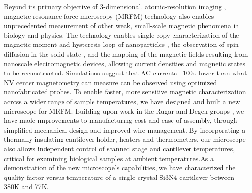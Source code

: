 Beyond its primary objective of 3-dimensional, atomic-resolution imaging \cite{Nichol_2013}, magnetic resonance force microscopy (MRFM) technology also enables unprecedented measurement of other weak, small-scale magnetic phenomena in biology and physics. The technology enables single-copy characterization of the magnetic moment and hysteresis loop of nanoparticles \cite{Weber_2012}, the observation of spin diffusion in the solid state \cite{Cardellino_2014}, and the mapping of the magnetic fields resulting from nanoscale electromagnetic devices, allowing current densities \cite{Chang_2017} \cite{Yongsunthon_2001} and magnetic states \cite{Tao_2016} to be reconstructed.  Simulations suggest that AC currents ~100x lower than what NV center magnetometry can measure \cite{Chang_2017} can be observed using optimized nanofabricated probes.
To enable faster, more sensitive magnetic characterization across a wider range of sample temperatures, we have designed and built a new microscope for MRFM. Building upon work in the Rugar \cite{Z_ger_1993} \cite{Degen_2009} and Degen groups \cite{Moores_2015}, we have made improvements to manufacturing cost and ease of assembly, through simplified mechanical design and improved wire management. By incorporating a thermally insulating cantilever holder, heaters and thermometers, our microscope also allows independent control of scanned stage and cantilever temperatures, critical for examining biological samples at ambient temperatures.As a demonstration of the new microscope's capabilities, we have characterized the quality factor versus temperature of a single-crystal Si3N4 cantilever between 380K and 77K.